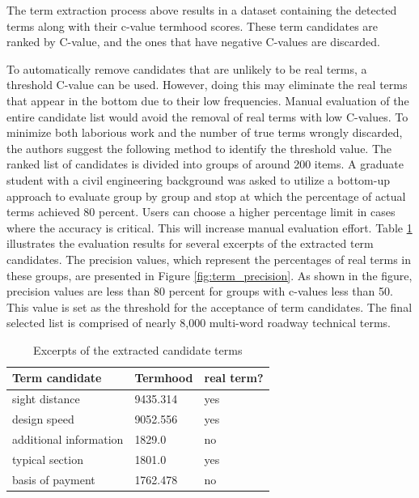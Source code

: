 \documentclass[Journal, BackFigs,NoLists, DoubleSpace]{ascelike}%
\begin{document}
%
\par
The term extraction process above results in a dataset containing the detected terms along with their c-value termhood scores. These term candidates are ranked by C-value, and the ones that have negative C-values are discarded.
\par
To automatically remove candidates that are unlikely to be real terms, a threshold C-value can be used. However, doing this may eliminate the real terms that appear in the bottom due to their low frequencies. Manual evaluation of the entire candidate list would avoid the removal of real terms with low C-values. To minimize both laborious work and the number of true terms wrongly discarded, the authors suggest the following method to identify the threshold value. The ranked list of candidates is divided into groups of around 200 items. A graduate student with a civil engineering background was asked to utilize a bottom-up approach to evaluate group by group and stop at which the percentage of actual terms achieved 80 percent. Users can choose a higher percentage limit in cases where the accuracy is critical. This will increase manual evaluation effort. Table \ref{table:term_evaluation} illustrates the evaluation results for several excerpts of the extracted term candidates. The precision values, which represent the percentages of real terms in these groups, are presented in Figure \ref{fig:term_precision}. As shown in the figure, precision values are less than 80 percent for groups with c-values less than 50. This value is set as the threshold for the acceptance of term candidates. The final selected list is comprised of nearly 8,000 multi-word roadway technical terms. 
%
\begin{table} [t]
	\caption{Excerpts of the extracted candidate terms}
	\label{table:term_evaluation}
	\centering
	\small
	\renewcommand{\arraystretch}{1.25}
	\begin{tabular}{l l l}
		\hline
		\textbf{Term candidate} & \textbf{Termhood} & \textbf{real term?}\\
		\hline
		sight distance		& 9435.314 & yes\\
		design speed & 9052.556 & yes \\
		additional information & 1829.0 & no\\
		typical section & 1801.0  & yes\\
		basis of payment & 1762.478 & no\\
		\hline
	\end{tabular}
	
	\normalsize
\end{table}
\end{document}
